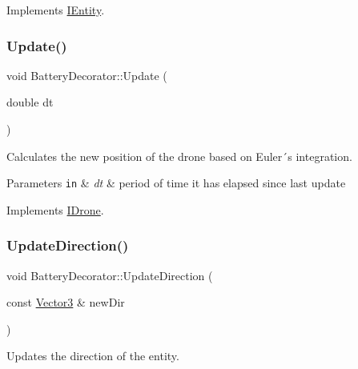 Implements \hyperlink{classIEntity_a49b3c54f94a93d4a9f96527ffb8982f5}{I\+Entity}.

\mbox{\label{classBatteryDecorator_a92ea38b63e41d61d7392cb58a53fa8d9}} 
\subsubsection{\texorpdfstring{Update()}{Update()}}
{\footnotesize\ttfamily void Battery\+Decorator\+::\+Update (\begin{DoxyParamCaption}\item[{double}]{dt }\end{DoxyParamCaption})\hspace{0.3cm}{\ttfamily [virtual]}}



Calculates the new position of the drone based on Euler´s integration. 


\begin{DoxyParams}[1]{Parameters}
\mbox{\tt in}  & {\em dt} & period of time it has elapsed since last update \\
\hline
\end{DoxyParams}


Implements \hyperlink{classIDrone_a6d840d60cda9a985b94af42ef54520b7}{I\+Drone}.

\mbox{\label{classBatteryDecorator_a42dfc0dc6cd4423f8113609ea7f5e938}} 
\subsubsection{\texorpdfstring{Update\+Direction()}{UpdateDirection()}}
{\footnotesize\ttfamily void Battery\+Decorator\+::\+Update\+Direction (\begin{DoxyParamCaption}\item[{const \hyperlink{classVector3}{Vector3} \&}]{new\+Dir }\end{DoxyParamCaption})\hspace{0.3cm}{\ttfamily [virtual]}}



Updates the direction of the entity. 


